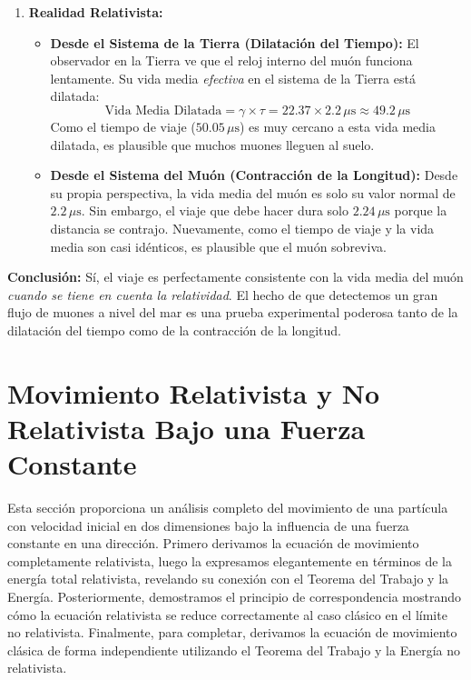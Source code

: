 \documentclass[11pt,a4paper]{article}
\begin{document}
\begin{itemize}
\begin{enumerate}
    \item \textbf{Realidad Relativista:}
    \begin{itemize}
        \item \textbf{Desde el Sistema de la Tierra (Dilatación del Tiempo):} El observador en la Tierra ve que el reloj interno del muón funciona lentamente. Su vida media \textit{efectiva} en el sistema de la Tierra está dilatada:
        \[ \text{Vida Media Dilatada} = \gamma \times \tau = 22.37 \times 2.2 \, \mu\text{s} \approx 49.2 \, \mu\text{s} \]
        Como el tiempo de viaje ($50.05 \, \mu\text{s}$) es muy cercano a esta vida media dilatada, es plausible que muchos muones lleguen al suelo.
        \item \textbf{Desde el Sistema del Muón (Contracción de la Longitud):} Desde su propia perspectiva, la vida media del muón es solo su valor normal de $2.2 \, \mu\text{s}$. Sin embargo, el viaje que debe hacer dura solo $2.24 \, \mu\text{s}$ porque la distancia se contrajo. Nuevamente, como el tiempo de viaje y la vida media son casi idénticos, es plausible que el muón sobreviva.
    \end{itemize}
\end{enumerate}
\textbf{Conclusión:} Sí, el viaje es perfectamente consistente con la vida media del muón \textit{cuando se tiene en cuenta la relatividad}. El hecho de que detectemos un gran flujo de muones a nivel del mar es una prueba experimental poderosa tanto de la dilatación del tiempo como de la contracción de la longitud.
\end{itemize}



\section{Movimiento Relativista y No Relativista Bajo una Fuerza Constante}
Esta sección proporciona un análisis completo del movimiento de una partícula con velocidad inicial en dos dimensiones bajo la influencia de una fuerza constante en una dirección. Primero derivamos la ecuación de movimiento completamente relativista, luego la expresamos elegantemente en términos de la energía total relativista, revelando su conexión con el Teorema del Trabajo y la Energía. Posteriormente, demostramos el principio de correspondencia mostrando cómo la ecuación relativista se reduce correctamente al caso clásico en el límite no relativista. Finalmente, para completar, derivamos la ecuación de movimiento clásica de forma independiente utilizando el Teorema del Trabajo y la Energía no relativista.
\end{document}
